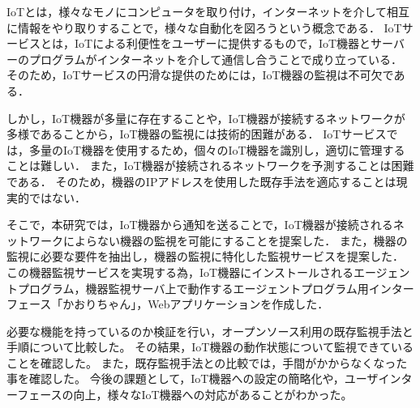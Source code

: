 IoTとは，様々なモノにコンピュータを取り付け，インターネットを介して相互に情報をやり取りすることで，様々な自動化を図ろうという概念である．
IoTサービスとは，IoTによる利便性をユーザーに提供するもので，IoT機器とサーバーのプログラムがインターネットを介して通信し合うことで成り立っている．
そのため，IoTサービスの円滑な提供のためには，IoT機器の監視は不可欠である．
\medskip

しかし，IoT機器が多量に存在することや，IoT機器が接続するネットワークが多様であることから，IoT機器の監視には技術的困難がある．
IoTサービスでは，多量のIoT機器を使用するため，個々のIoT機器を識別し，適切に管理することは難しい．
また，IoT機器が接続されるネットワークを予測することは困難である．
そのため，機器のIPアドレスを使用した既存手法を適応することは現実的ではない．
\medskip

そこで，本研究では，IoT機器から通知を送ることで，IoT機器が接続されるネットワークによらない機器の監視を可能にすることを提案した．
また，機器の監視に必要な要件を抽出し，機器の監視に特化した監視サービスを提案した．
この機器監視サービスを実現する為，IoT機器にインストールされるエージェントプログラム，機器監視サーバ上で動作するエージェントプログラム用インターフェース「かおりちゃん」，Webアプリケーションを作成した．
\medskip

必要な機能を持っているのか検証を行い，オープンソース利用の既存監視手法と手順について比較した。
その結果，IoT機器の動作状態について監視できていることを確認した。
また，既存監視手法との比較では，手間がかからなくなった事を確認した。
今後の課題として，IoT機器への設定の簡略化や，ユーザインターフェースの向上，様々なIoT機器への対応があることがわかった。

